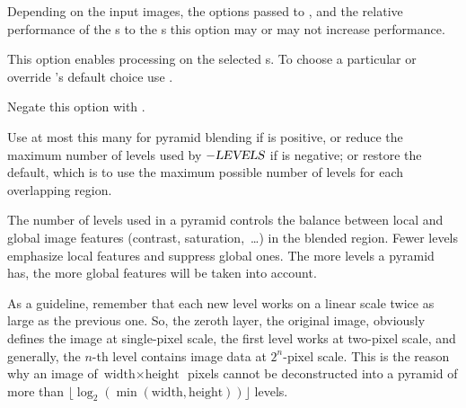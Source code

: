 \begin{codelist}
  Depending on the input images, the options passed to \App{}, and the relative performance of
  the s to the s this option may or may not increase performance.

  This option enables  processing on the selected s.  To choose a
  particular  or override \App's default choice use
  .

  Negate this option with .


  \label{opt:levels}%
\item[\itempar{-l \metavar{LEVELS} \\ --levels=\metavar{LEVELS}}]\itemend
  Use at most this many  for pyramid\footnotemark{} blending if  is
  positive, or reduce the maximum number of levels used by $-\textsl{LEVELS}$ if
   is negative;  or  restore the default, which
  is to use the maximum possible number of levels for each overlapping region.


  The number of levels used in a pyramid controls the balance between local and global image
  features (contrast, saturation,~\dots) in the blended region.  Fewer levels emphasize local
  features and suppress global ones.  The more levels a pyramid has, the more global features
  will be taken into account.

  \begin{geeknote}
    As a guideline, remember that each new level works on a linear scale twice as large as the
    previous one.  So, the zeroth layer, the original image, obviously defines the image at
    single-pixel scale, the first level works at two-pixel scale, and generally, the $n$-th
    level contains image data at $2^n$-pixel scale.  This is the reason why an image of
    $\mbox{width} \times \mbox{height}$~pixels cannot be deconstructed into a pyramid of more
    than $\lfloor \log_2(\min(\mbox{width}, \mbox{height})) \rfloor$ levels.


\end{geeknote}
\end{codelist}
